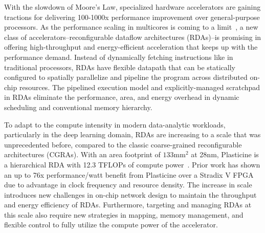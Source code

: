 

With the slowdown of Moore’s Law, specialized hardware accelerators are gaining tractions 
for delivering 100-1000x performance improvement over general-purpose processors. 
As the performance scaling in multicores is coming to a limit~\cite{multicorescale}, a new
class of accelerators--reconfigurable dataflow architectures (RDAs)--is promising in 
offering high-throughput and energy-efficient acceleration that keeps up with the performance demand.
Instead of dynamically fetching instructions like in traditional processors, RDAs have flexible datapath 
that can be statically configured to spatially parallelize and pipeline the program across
distributed on-chip resources. 
The pipelined execution model and explicitly-managed scratchpad in RDAs eliminate
the performance, area, and energy overhead in dynamic scheduling and conventional memory hierarchy.

To adapt to the compute intensity in modern data-analytic workloads, particularly in the deep learning
domain, RDAs are increasing to a scale that was unprecedented before, compared to the classic coarse-grained
reconfigurable architectures (CGRAs).
With an area footprint of $133\text{mm}^2$ at 28nm, 
Plasticine is a hierarchical RDA with 12.3 TFLOPs of compute power~\cite{plasticine}.
Prior work has shown an up to 76x performance/watt benefit from Plasticine over a Stradix V FPGA 
due to advantage in clock frequency and resource density.
The increase in scale introduces new challenges in on-chip network design to maintain 
the throughput and energy efficiency of RDAs.
Furthermore, targeting and managing RDAs at this scale also require new strategies in mapping, 
memory management, and flexible control to fully utilize the compute power of the accelerator. 

